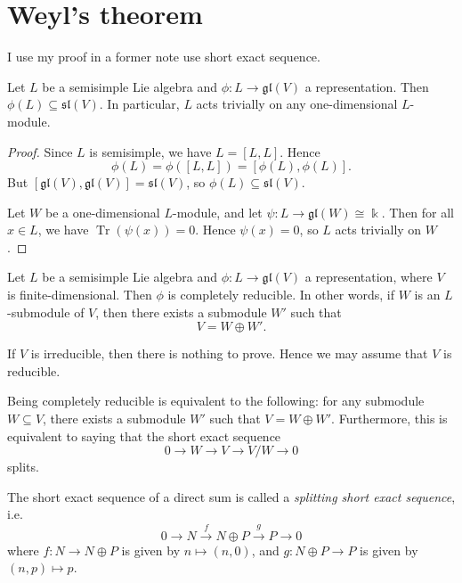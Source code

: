 \section{Weyl's theorem}

I use my proof in a former note use short exact sequence.

\begin{lemma}
    Let $L$ be a semisimple Lie algebra and $\phi : L \to \mathfrak{gl}(V)$ a representation. Then $\phi(L) \subseteq \mathfrak{sl}(V)$. In particular, $L$ acts trivially on any one-dimensional $L$-module.
\end{lemma}

\begin{proof}
    Since $L$ is semisimple, we have $L = [L,L]$. Hence
    \[
        \phi(L) = \phi([L,L]) = [\phi(L), \phi(L)].
    \]
    But $[\mathfrak{gl}(V), \mathfrak{gl}(V)] = \mathfrak{sl}(V)$, so $\phi(L) \subseteq \mathfrak{sl}(V)$.

    Let $W$ be a one-dimensional $L$-module, and let $\psi : L \to \mathfrak{gl}(W) \cong \Bbbk$. Then for all $x \in L$, we have $\operatorname{Tr}(\psi(x)) = 0$. Hence $\psi(x) = 0$, so $L$ acts trivially on $W$.
\end{proof}

\begin{theorem}
    Let $L$ be a semisimple Lie algebra and $\phi : L \to \mathfrak{gl}(V)$ a representation, where $V$ is finite-dimensional. Then $\phi$ is completely reducible. In other words, if $W$ is an $L$-submodule of $V$, then there exists a submodule $W'$ such that
    \[
        V = W \oplus W'.
    \]
\end{theorem}

\begin{remark}
    If $V$ is irreducible, then there is nothing to prove. Hence we may assume that $V$ is reducible.
\end{remark}

\begin{remark}
    Being completely reducible is equivalent to the following: for any submodule $W \subseteq V$, there exists a submodule $W'$ such that $V = W \oplus W'$. Furthermore, this is equivalent to saying that the short exact sequence
    \[
        0 \longrightarrow W \longrightarrow V \longrightarrow V/W \longrightarrow 0
    \]
    splits.
\end{remark}

\begin{definition}[Definition 2.17]
    The short exact sequence of a direct sum is called a \emph{splitting short exact sequence}, i.e.
    \[
        0 \longrightarrow N \xrightarrow{f} N \oplus P \xrightarrow{g} P \longrightarrow 0
    \]
    where $f : N \to N \oplus P$ is given by $n \mapsto (n,0)$, and
    $g : N \oplus P \to P$ is given by $(n,p) \mapsto p$.
\end{definition}


